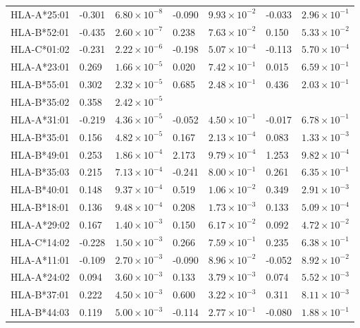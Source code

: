 \documentclass[]{article}
\begin{document}
\begin{longtable}[H]{lp{1cm}p{2cm}p{1cm}p{2cm}p{1cm}p{2cm}}
		HLA-A*25:01 & -0.301 & $6.80 \times 10^{-8}$ & -0.090 & $9.93 \times 10^{-2}$ & -0.033 & $2.96 \times 10^{-1}$ \\ 
		HLA-B*52:01 & -0.435 & $2.60 \times 10^{-7}$ & 0.238 & $7.63 \times 10^{-2}$ & 0.150 & $5.33 \times 10^{-2}$ \\ 
		HLA-C*01:02 & -0.231 & $2.22 \times 10^{-6}$ & -0.198 & $5.07 \times 10^{-4}$ & -0.113 & $5.70 \times 10^{-4}$ \\ 
		HLA-A*23:01 & 0.269 & $1.66 \times 10^{-5}$ & 0.020 & $7.42 \times 10^{-1}$ & 0.015 & $6.59 \times 10^{-1}$ \\ 
		HLA-B*55:01 & 0.302 & $2.32 \times 10^{-5}$ & 0.685 & $2.48 \times 10^{-1}$ & 0.436 & $2.03 \times 10^{-1}$ \\ 
		HLA-B*35:02 & 0.358 & $2.42 \times 10^{-5}$ &  &  &  &  \\ 
		HLA-A*31:01 & -0.219 & $4.36 \times 10^{-5}$ & -0.052 & $4.50 \times 10^{-1}$ & -0.017 & $6.78 \times 10^{-1}$ \\ 
		HLA-B*35:01 & 0.156 & $4.82 \times 10^{-5}$ & 0.167 & $2.13 \times 10^{-4}$ & 0.083 & $1.33 \times 10^{-3}$ \\ 
		HLA-B*49:01 & 0.253 & $1.86 \times 10^{-4}$ & 2.173 & $9.79 \times 10^{-4}$ & 1.253 & $9.82 \times 10^{-4}$ \\ 
		HLA-B*35:03 & 0.215 & $7.13 \times 10^{-4}$ & -0.241 & $8.00 \times 10^{-1}$ & 0.261 & $6.35 \times 10^{-1}$ \\ 
		HLA-B*40:01 & 0.148 & $9.37 \times 10^{-4}$ & 0.519 & $1.06 \times 10^{-2}$ & 0.349 & $2.91 \times 10^{-3}$ \\ 
		HLA-B*18:01 & 0.136 & $9.48 \times 10^{-4}$ & 0.208 & $1.73 \times 10^{-3}$ & 0.133 & $5.09 \times 10^{-4}$ \\ 
		HLA-A*29:02 & 0.167 & $1.40 \times 10^{-3}$ & 0.150 & $6.17 \times 10^{-2}$ & 0.092 & $4.72 \times 10^{-2}$ \\ 
		HLA-C*14:02 & -0.228 & $1.50 \times 10^{-3}$ & 0.266 & $7.59 \times 10^{-1}$ & 0.235 & $6.38 \times 10^{-1}$ \\ 
		HLA-A*11:01 & -0.109 & $2.70 \times 10^{-3}$ & -0.090 & $8.96 \times 10^{-2}$ & -0.052 & $8.92 \times 10^{-2}$ \\ 
		HLA-A*24:02 & 0.094 & $3.60 \times 10^{-3}$ & 0.133 & $3.79 \times 10^{-3}$ & 0.074 & $5.52 \times 10^{-3}$ \\ 
		HLA-B*37:01 & 0.222 & $4.50 \times 10^{-3}$ & 0.600 & $3.22 \times 10^{-3}$ & 0.311 & $8.11 \times 10^{-3}$ \\ 
		HLA-B*44:03 & 0.119 & $5.00 \times 10^{-3}$ & -0.114 & $2.77 \times 10^{-1}$ & -0.080 & $1.88 \times 10^{-1}$ \\ 

\end{longtable}
\end{document}
